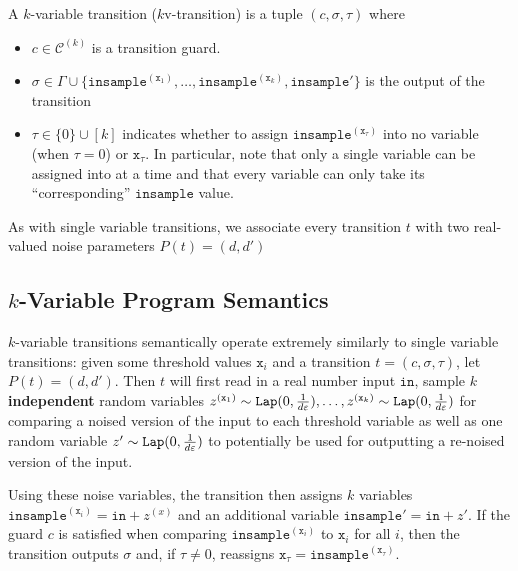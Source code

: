 
\begin{defn}
    A $k$-variable transition ($k$v-transition) is a tuple $(c, \sigma, \tau)$ where \begin{itemize}
        \item $c\in\mathcal{C}^{(k)}$ is a transition guard.
        \item $\sigma\in\Gamma\cup\{\texttt{insample}^{(\texttt{x}_1)}, \ldots, \texttt{insample}^{(\texttt{x}_k)}, \texttt{insample}'\}$ is the output of the transition
        \item $\tau \in \{0\} \cup [k]$ indicates whether to assign $\texttt{insample}^{(\texttt{x}_\tau)}$ into no variable (when $\tau = 0$) or $\texttt{x}_\tau$. In particular, note that only a single variable can be assigned into at a time and that every variable can only take its ``corresponding'' $\texttt{insample}$ value. 
    \end{itemize}
\end{defn}

As with single variable transitions, we associate every transition $t$ with two real-valued noise parameters $P(t) = (d, d')$

\subsection{$k$-Variable Program Semantics}

$k$-variable transitions semantically operate extremely similarly to single variable transitions: given some threshold values $\texttt{x}_i$ and a transition $t = (c, \sigma, \tau)$, let $P(t) = (d, d')$. Then $t$ will first read in a real number input $\texttt{in}$, 
sample $k$ \textbf{independent} random variables $z^{(\texttt{x}_1)}\sim\texttt{Lap}(0, \frac{1}{d\varepsilon}),\ldots, z^{(\texttt{x}_k)}\sim\texttt{Lap}(0, \frac{1}{d\varepsilon})$ for comparing a noised version of the input to each threshold variable as well as one random variable $z' \sim\texttt{Lap}(0, \frac{1}{d\varepsilon})$ to potentially be used for outputting a re-noised version of the input. 

Using these noise variables, the transition then assigns $k$ variables $\texttt{insample}^{(\texttt{x}_i)} = \texttt{in} + z^{(x)}$ and an additional variable $\texttt{insample}' = \texttt{in} + z'$. 
If the guard $c$ is satisfied when comparing $\texttt{insample}^{(\texttt{x}_i)}$ to $\texttt{x}_i$ for all $i$, then the transition outputs $\sigma$ and, if $\tau\neq 0$, reassigns $\texttt{x}_{\tau} = \texttt{insample}^{(\texttt{x}_\tau)}$.


